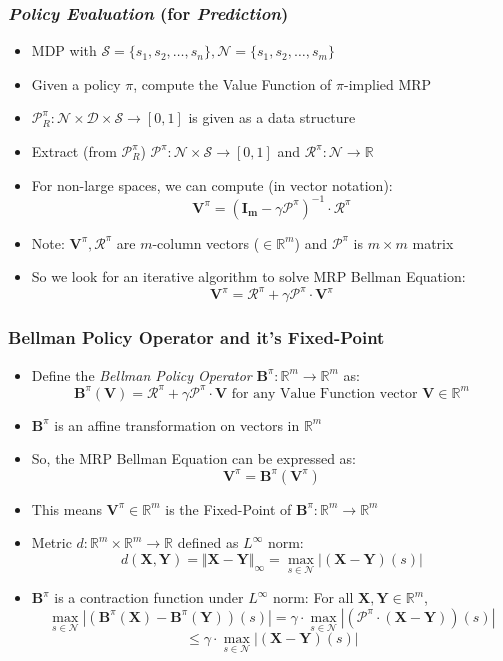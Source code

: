 \documentclass[handout]{beamer}
\newcommand{\bvpi}{\bm{V}^{\pi}}
\newcommand{\bbpi}{\bm{B}^{\pi}}
\newcommand{\bv}{\bm{V}}
\begin{document}
\begin{frame}
\frametitle{{\em Policy Evaluation} (for {\em Prediction})}
\pause
\begin{itemize}[<+->]
\item MDP with $\mathcal{S} = \{s_1, s_2, \ldots, s_n\}, \mathcal{N} = \{s_1, s_2, \ldots, s_m \}$
\item Given a policy $\pi$, compute the Value Function of $\pi$-implied MRP
\item $\mathcal{P}_R^{\pi}: \mathcal{N} \times \mathcal{D} \times \mathcal{S} \rightarrow [0, 1]$ is given as a data structure
\item Extract (from $\mathcal{P}_R^{\pi}$) $\mathcal{P}^{\pi}: \mathcal{N} \times \mathcal{S} \rightarrow [0, 1]$ and  $\mathcal{R}^{\pi}: \mathcal{N} \rightarrow \mathbb{R}$
\item For non-large spaces, we can compute (in vector notation):
$${\bm V}^{\pi} = (\bm{I_m} - \gamma \bm{\mathcal{P}}^{\pi})^{-1} \cdot \bm{\mathcal{R}}^{\pi}$$
\item Note: $\bvpi, \bm{\mathcal{R}}^{\pi}$ are $m$-column vectors ($\in \mathbb{R}^m$) and $\bm{\mathcal{P}}^{\pi}$ is $m \times m$ matrix
\item So we look for an iterative algorithm to solve MRP Bellman Equation:
$$\bvpi  = \bm{\mathcal{R}}^{\pi} + \gamma \bm{\mathcal{P}}^{\pi} \cdot \bvpi$$
\end{itemize}
\end{frame}

\begin{frame}
\frametitle{Bellman Policy Operator and it's Fixed-Point}
\pause
\begin{itemize}[<+->]
\item Define the {\em Bellman Policy Operator} $\bbpi: \mathbb{R}^m \rightarrow \mathbb{R}^m$ as:
$$\bbpi(\bv) = \bm{\mathcal{R}}^{\pi} + \gamma \bm{\mathcal{P}}^{\pi} \cdot \bv \text{ for any Value Function vector } \bv \in \mathbb{R}^m$$
\item $\bbpi$ is an affine transformation on vectors in $\mathbb{R}^m$
\item So, the MRP Bellman Equation can be expressed as:
$$\bvpi = \bbpi(\bvpi)$$
\item This means $\bvpi \in \mathbb{R}^m$ is the Fixed-Point of $\bbpi: \mathbb{R}^m \rightarrow \mathbb{R}^m$
\item Metric $d: \mathbb{R}^m \times \mathbb{R}^m \rightarrow \mathbb{R}$ defined as $L^{\infty}$ norm:
$$d(\bm{X}, \bm{Y}) = \Vert \bm{X} - \bm{Y} \Vert_{\infty} = \max_{s \in \mathcal{N}} |(\bm{X} - \bm{Y})(s)|$$
\item $\bbpi$ is a contraction function under $L^{\infty}$ norm: For all $\bm{X}, \bm{Y} \in \mathbb{R}^m$,
$$\max_{s \in \mathcal{N}} |(\bbpi(\bm{X}) - \bbpi(\bm{Y}))(s)| = \gamma \cdot \max_{s \in \mathcal{N}} |(\bm{\mathcal{P}}^{\pi} \cdot (\bm{X} - \bm{Y}))(s)|$$
$$ \leq \gamma \cdot \max_{s \in \mathcal{N}} |(\bm{X} - \bm{Y})(s)|$$
\end{itemize}
\end{frame}
\end{document}
